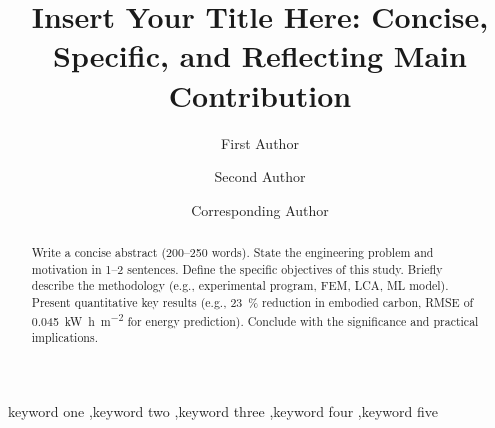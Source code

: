 \documentclass[preprint,12pt,3p]{elsarticle}
\begin{document}
\begin{frontmatter}

\title{Insert Your Title Here: Concise, Specific, and Reflecting Main Contribution}

\author[inst1]{First Author}
\author[inst2]{Second Author}
\author[inst1,inst3]{Corresponding Author}





\begin{abstract}
Write a concise abstract (200–250 words).
State the engineering problem and motivation in 1–2 sentences.
Define the specific objectives of this study.
Briefly describe the methodology (e.g., experimental program, FEM, LCA, ML model).
Present quantitative key results (e.g., \SI{23}{\percent} reduction in embodied carbon,
RMSE of \SI{0.045}{\kilo\watt\hour\per\meter\squared} for energy prediction).
Conclude with the significance and practical implications.
\end{abstract}

\begin{keyword}
keyword one \sep keyword two \sep keyword three \sep keyword four \sep keyword five
\end{keyword}

\end{frontmatter}
\end{document}
